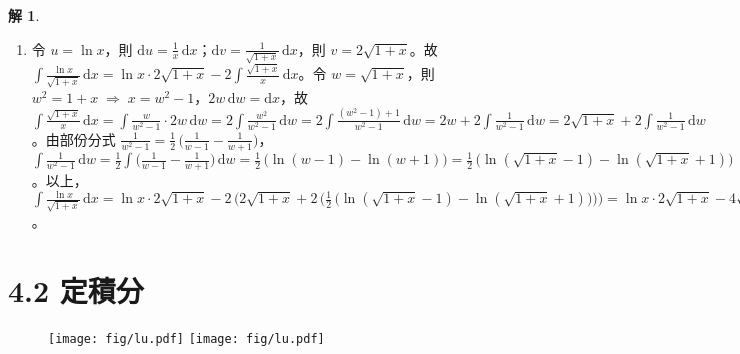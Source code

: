 \documentclass[12pt]{extarticle}
\newcommand{\ds}{\displaystyle}
\newcommand{\ie}{\;\Longrightarrow\;}
\theoremstyle{definition}
\newtheorem*{sol}{解}
\newcommand{\myline}{\noindent\makebox[\linewidth]{\rule{\paperwidth}{0.4pt}}}
\begin{document}
\begin{sol}
\begin{enumerate}
\begin{minipage}{0.15\textwidth}
\begin{tikzpicture}[yscale=0.75]
        \end{tikzpicture}
      \end{minipage}
      \hspace{5mm}
      \begin{minipage}{0.8\textwidth}
        \begin{align*}
          &\int e^w\sin w\,\mathrm{d}w = e^{w}\sin w - e^w\cos w - \int e^w\sin w\,\mathrm{d}w\\ 
          &\ie\int e^w\sin w\,\mathrm{d}w = \frac{e^w(\sin w - \cos w)}{2}
        \end{align*}
      \end{minipage}
    \item 令 $\ds u = \ln x$，則 $\ds\text{d}u = \frac{1}{x}\,\text{d}x$；$\ds\text{d}v = \frac{1}{\sqrt{1 + x}}\,\text{d}x$，則 $\ds v = 2\sqrt{1 + x}$。故 $\ds\int\frac{\ln x}{\sqrt{1 + x}}\,\text{d}x = \ln x\cdot 2\sqrt{1 + x} - 2 \int\frac{\sqrt{1 + x}}{x}\,\text{d}x$。令 $\ds w = \sqrt{1 + x}$，則 $\ds w^2 = 1 + x \ie x= w^2 - 1$，$\ds 2w\,\text{d}w = \text{d}x$，故 $\ds\int\frac{\sqrt{1 + x}}{x}\,\text{d}x = \int\frac{w}{w^2 - 1}\cdot 2w\,\text{d}w = 2\int\frac{w^2}{w^2 - 1}\,\text{d}w = 2\int\frac{(w^2 - 1) + 1}{w^2 - 1}\,\text{d}w = 2 w + 2\int\frac{1}{w^2 - 1}\,\text{d}w = 2\sqrt{1 + x} + 2\int\frac{1}{w^2 -1}\,\text{d}w$。由部份分式 $\ds\frac{1}{w^2 - 1} = \frac{1}{2}\,\Big(\frac{1}{w - 1} - \frac{1}{w + 1}\Big)$，$\ds\int\frac{1}{w^2 - 1}\,\text{d}w = \frac{1}{2}\int\Big(\frac{1}{w - 1} - \frac{1}{w + 1}\Big)\,\text{d}w =\frac{1}{2}\,\big(\ln(w - 1) - \ln(w + 1)\big) = \frac{1}{2}\,\big(\ln(\sqrt{1 + x} - 1) - \ln(\sqrt{1 + x} + 1)\big)$。以上，$\ds\int\frac{\ln x}{\sqrt{1 + x}}\,\mathrm{d}x = \ln x\cdot 2\sqrt{1 + x} - 2\,\big(2\sqrt{1+x} + 2\,\big(\frac{1}{2}\,\big(\ln(\sqrt{1 + x}-1) - \ln(\sqrt{1+x} + 1)\big)\big)\big) = \ln x\cdot 2\sqrt{1 + x} - 4\sqrt{1+x} - 2\ln(\sqrt{1 + x}-1) + 2\ln(\sqrt{1+x} + 1) + c$。
  \end{enumerate}
\end{sol}

\myline

\section*{4.2 定積分}

\begin{figure}[!htbp]
  \centering
  \texttt{[image: fig/lu.pdf]}
  \texttt{[image: fig/lu.pdf]}
\end{figure}
\end{document}
